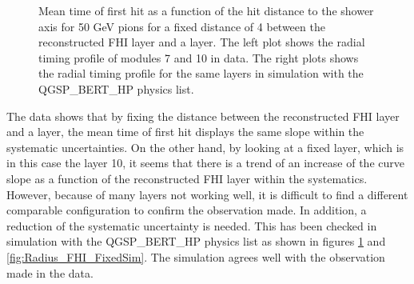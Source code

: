 \begin{figure}[htbp!]
\begin{subfigure}[t]{0.49\textwidth}
		\caption{}\label{fig:Radius_FHISim1}
	\end{subfigure}
	\caption{Mean time of first hit as a function of the hit distance to the shower axis for 50 GeV pions for a fixed distance of 4 between the reconstructed FHI layer and a layer. The left plot shows the radial timing profile of modules 7 and 10 in data. The right plots shows the radial timing profile for the same layers in simulation with the QGSP\_BERT\_HP physics list.}
	\label{fig:Radius_FHIAll}
\end{figure}

The data shows that by fixing the distance between the reconstructed FHI layer and a layer, the mean time of first hit displays the same slope within the systematic uncertainties. On the other hand, by looking at a fixed layer, which is in this case the layer 10, it seems that there is a trend of an increase of the curve slope as a function of the reconstructed FHI layer within the systematics. However, because of many layers not working well, it is difficult to find a different comparable configuration to confirm the observation made. In addition, a reduction of the systematic uncertainty is needed. This has been checked in simulation with the QGSP\_BERT\_HP physics list as shown in figures \ref{fig:Radius_FHISim1} and \ref{fig:Radius_FHI_FixedSim}. The simulation agrees well with the observation made in the data.

